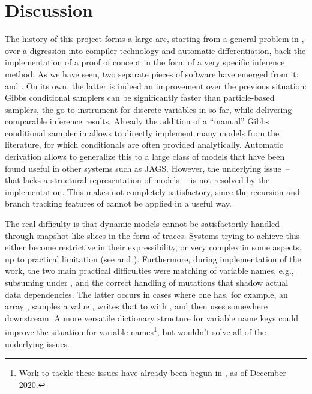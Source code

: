 \chapter{Discussion}
\label{cha:discussion}

The history of this project forms a large arc, starting from a general problem in \turingjl{}, over
a digression into compiler technology and automatic differentiation, back the implementation of a
proof of concept in the form of a very specific inference method.  As we have seen, two separate
pieces of software have emerged from it: \irtrackerjl{} and \autogibbsjl{}.  On its own, the latter
is indeed an improvement over the previous situation: Gibbs conditional samplers can be
significantly faster than particle-based samplers, the go-to instrument for discrete variables in
\turingjl{} so far, while delivering comparable inference results.  Already the addition of a
\enquote{manual} Gibbs conditional sampler in \turingjl{} allows to directly implement many models
from the literature, for which conditionals are often provided analytically.  Automatic derivation
allows to generalize this to a large class of models that have been found useful in other systems
such as JAGS.  However, the underlying issue~-- that \turingjl{} lacks a structural representation
of models~-- is not resolved by the implementation.  This makes \autogibbsjl{} not
completely satisfactory, since the recursion and branch tracking features of \irtrackerjl{} cannot
be applied in a useful way.

The real difficulty is that dynamic models cannot be satisfactorily handled through snapshot-like
slices in the form of traces.  Systems trying to achieve this either become restrictive in their
expressibility, or very complex in some aspects, up to practical limitation (see
\textcite{mansinghka2014venture} and \textcite{goodman2012church}).  Furthermore, during
implementation of the work, the two main practical difficulties were matching of variable names,
e.g., subsuming  under , and the correct handling of mutations that
shadow actual data dependencies.  The latter occurs in cases where one has, for example, an array
, samples a value , writes that to  with , and then
uses  somewhere downstream.  A more versatile dictionary structure for
variable name keys could improve the situation for variable names\footnote{Work to tackle these
  issues have already been begun in \turingjl{}, as of December 2020.}, but wouldn't solve all of
the underlying issues.

